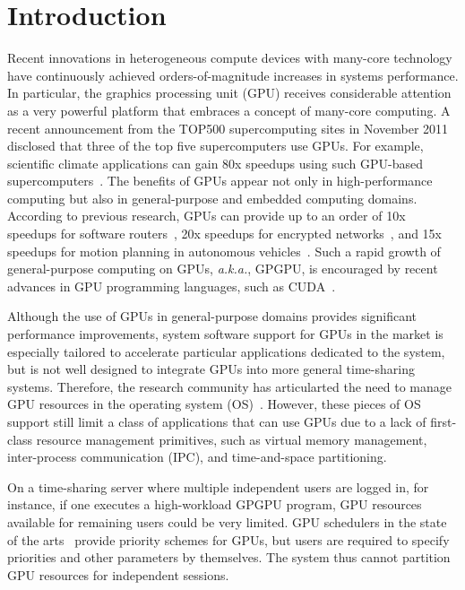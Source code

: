 \section{Introduction}
\label{sec:introduction}

Recent innovations in heterogeneous compute devices with many-core
technology have continuously achieved orders-of-magnitude increases in
systems performance. 
In particular, the graphics processing unit (GPU) receives considerable
attention as a very powerful platform that embraces a concept of
many-core computing.
A recent announcement from the TOP500 supercomputing sites in November
2011~\cite{TOP500} disclosed that three of the top five supercomputers
use GPUs.
For example, scientific climate applications can gain 80x speedups using
such GPU-based supercomputers~\cite{Shimokawabe10}.
The benefits of GPUs appear not only in high-performance computing but
also in general-purpose and embedded computing domains.
According to previous research, GPUs can provide up to an order of 10x
speedups for software routers~\cite{Han_SIGCOMM10}, 20x speedups for
encrypted networks~\cite{Jang_NSDI11}, and 15x speedups for motion
planning in autonomous vehicles~\cite{McNaughton_ICRA11}.
Such a rapid growth of general-purpose computing on GPUs,
\textit{a.k.a.}, GPGPU, is encouraged by recent advances in GPU
programming languages, such as CUDA~\cite{CUDA40}.

Although the use of GPUs in general-purpose domains provides significant
performance improvements, system software support for GPUs in the market
is especially  tailored to accelerate particular applications dedicated
to the system, but is not well designed to integrate GPUs into more
general time-sharing systems.
Therefore, the research community has articularted the need to manage GPU
resources in the operating system (OS)~\cite{Bautin_MCNC08, Kato_ATC11,
Rossbach_SOSP11}.
However, these pieces of OS support still limit a class of applications
that can use GPUs due to a lack of first-class resource management
primitives, such as virtual memory management, inter-process
communication (IPC), and time-and-space partitioning.

On a time-sharing server where multiple independent users are logged in,
for instance, if one executes a high-workload GPGPU program, GPU
resources available for remaining users could be very limited. 
GPU schedulers in the state of the arts~\cite{Kato_ATC11,
Rossbach_SOSP11} provide priority schemes for GPUs, but users
are required to specify priorities and other parameters by themselves.
The system thus cannot partition GPU resources for independent sessions.

